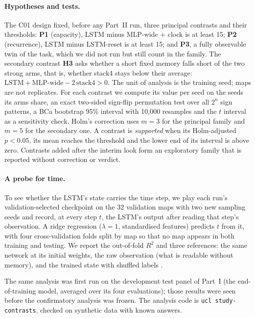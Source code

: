 \paragraph{Hypotheses and tests.}
The C01 design fixed, before any Part~II run, three principal contrasts and their thresholds:
\textbf{P1} (capacity), LSTM minus MLP-wide + clock is at least 15\pp; \textbf{P2} (recurrence),
LSTM minus LSTM-reset is at least 15\pp; and \textbf{P3}, a fully observable twin of the task,
which we did not run but still count in the family. The secondary contrast \textbf{H3} asks
whether a short fixed memory falls short of the two strong arms, that is, whether stack4 stays
below their average: $\text{LSTM} + \text{MLP-wide} - 2\,\text{stack4} > 0$. The unit of analysis is the training seed; maps are not replicates. For
each contrast we compute its value per seed on the seeds its arms share, an exact two-sided
sign-flip permutation test over all $2^n$ sign patterns, a BCa bootstrap 95\% interval with
10,000 resamples \citep{efron1993bootstrap} and the $t$ interval as a sensitivity check. Holm's
correction \citep{holm1979simple} uses $m=3$ for the principal family and $m=5$ for the secondary
one. A contrast is \emph{supported} when its Holm-adjusted $p<0.05$, its mean reaches the
threshold and the lower end of its interval is above zero. Contrasts added after the interim
look form an exploratory family that is reported without correction or verdict.

\paragraph{A probe for time.}
To see whether the LSTM's state carries the time step, we play each run's validation-selected
checkpoint on the 32 validation maps with two new sampling seeds and record, at every step $t$,
the LSTM's output after reading that step's observation. A ridge regression ($\lambda=1$,
standardised features) predicts $t$ from it, with four cross-validation folds split by map so that
no map appears in both training and testing. We report the out-of-fold $R^2$ and three
references: the same network at its initial weights, the raw observation (what is readable
without memory), and the trained state with shuffled labels \citep{hewitt2019control}.

The same analysis was first run on the development test panel of Part~I (the end-of-training
model, averaged over its four evaluations); those results were seen before the confirmatory
analysis was frozen. The analysis code is \texttt{ucl study-contrasts}, checked on synthetic data
with known answers.
